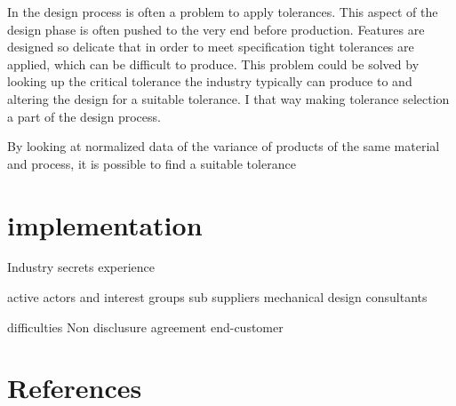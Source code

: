 \documentclass[aip,amsmath,reprint, author-year]{revtex4-1}
\begin{document}
In the design process is often a problem to apply tolerances. This aspect of the design phase is often pushed to the very end before production. Features are designed so delicate that in order to meet specification tight tolerances are applied, which can be difficult to produce.
This problem could be solved by looking up the critical tolerance the industry typically can produce to and altering the design for a suitable tolerance.  I that way making tolerance selection a part of the design process.

By looking at normalized data of the variance of products of the same material and process, it is possible to find a suitable tolerance

\section{implementation}




Industry secrets
	experience
	
	
active actors and interest groups
	sub suppliers 
	mechanical design consultants
	

difficulties
	Non disclusure agreement
	end-customer
	

\section*{References}

\end{document}
